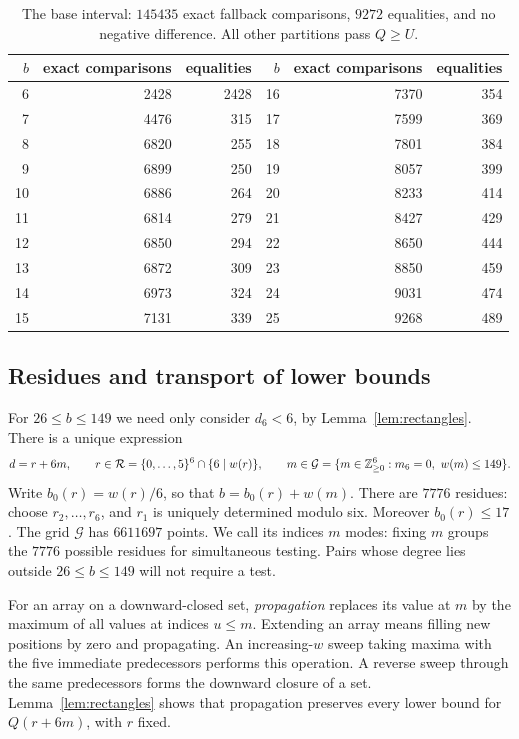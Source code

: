 \begin{table}[ht]
\centering
\begin{tabular}{r|r|r@{\qquad}r|r|r}
\(b\)&exact comparisons&equalities&\(b\)&exact comparisons&equalities\\ \hline
6&2428&2428&16&7370&354\\
7&4476&315&17&7599&369\\
8&6820&255&18&7801&384\\
9&6899&250&19&8057&399\\
10&6886&264&20&8233&414\\
11&6814&279&21&8427&429\\
12&6850&294&22&8650&444\\
13&6872&309&23&8850&459\\
14&6973&324&24&9031&474\\
15&7131&339&25&9268&489
\end{tabular}
\caption{The base interval: \(145435\) exact fallback comparisons,
\(9272\) equalities, and no negative difference. All other partitions
pass \(Q\ge U\).}\label{tab:base}
\end{table}

\subsection{Residues and transport of lower bounds}
For \(26\le b\le149\) we need only consider \(d_6<6\), by
Lemma~\ref{lem:rectangles}. There is a unique expression
\[
 d=r+6m,\qquad
 r\in\mathcal R=\{0,\ldots,5\}^6\cap\{6\mid w(r)\},\qquad
 m\in\mathcal G=\{m\in\mathbb Z_{\ge0}^6:m_6=0,\ w(m)\le149\}.
\]
Write \(b_0(r)=w(r)/6\), so that \(b=b_0(r)+w(m)\).
There are \(7776\) residues: choose \(r_2,\ldots,r_6\), and \(r_1\) is
uniquely determined modulo six. Moreover \(b_0(r)\le17\).
The grid \(\mathcal G\) has \(6611697\) points. We call its indices
\(m\) modes: fixing \(m\) groups the \(7776\) possible residues for
simultaneous testing. Pairs whose degree lies outside
\(26\le b\le149\) will not require a test.

For an array on a downward-closed set, \emph{propagation} replaces its
value at \(m\) by the maximum of all values at indices \(u\le m\).
Extending an array means filling new positions by zero and propagating.
An increasing-\(w\) sweep taking maxima with the five immediate
predecessors performs this operation. A reverse sweep through the same
predecessors forms the downward closure of a set.
Lemma~\ref{lem:rectangles} shows that propagation preserves every lower
bound for \(Q(r+6m)\), with \(r\) fixed.

